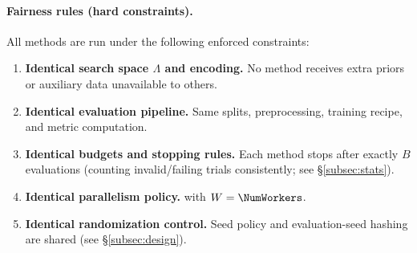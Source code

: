 \paragraph{Fairness rules (hard constraints).}
All methods are run under the following enforced constraints:
\begin{enumerate}
    \item \textbf{Identical search space \(\Lambda\) and encoding.} No method receives extra priors or auxiliary data unavailable to others.
    \item \textbf{Identical evaluation pipeline.} Same splits, preprocessing, training recipe, and metric computation.
    \item \textbf{Identical budgets and stopping rules.} Each method stops after exactly \(B\) evaluations
    (counting invalid/failing trials consistently; see \S\ref{subsec:stats}).
    \item \textbf{Identical parallelism policy.} \ParallelismPolicy{} with \(W=\NumWorkers\).
    \item \textbf{Identical randomization control.} Seed policy and evaluation-seed hashing are shared (see \S\ref{subsec:design}).
\end{enumerate}
